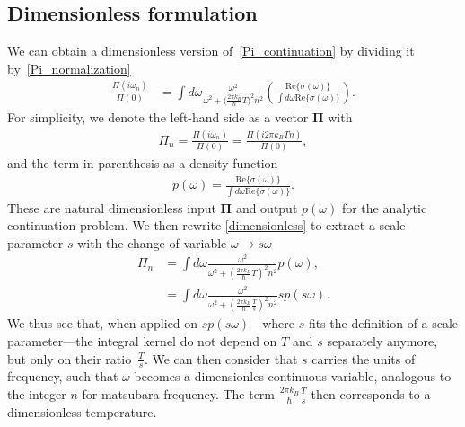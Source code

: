 \documentclass[notitlepage,11pt,nofootinbib]{revtex4-1}
\renewcommand{\vec}[1]{\bm{#1}}
\begin{document}
\subsection{Dimensionless formulation}
We can obtain a dimensionless version of~\eqref{Pi_continuation} by dividing it by~\eqref{Pi_normalization}
\begin{align}
\frac{\Pi(i\omega_n)}{\Pi(0)}
&=
\int d\omega \frac{\omega^2}{
\omega^2+
\big(\frac{2\pi k_B}{\hbar}T\big)
^2n^2
}\left(
\frac{\text{Re}\{ \sigma(\omega) \}}
{\int d\omega \text{Re}\{ \sigma(\omega) \}}
\right).
\label{dimensionless}
\end{align}
For simplicity, we denote the left-hand side as a vector $\vec \Pi$ with
\begin{align}
\Pi_n = \frac{\Pi(i\omega_n)}{\Pi(0)} = \frac{\Pi(i2\pi k_B T n)}{\Pi(0)},
\end{align}
and the term in parenthesis as a density function
\begin{align}
p(\omega) =
\frac{\text{Re}\{ \sigma(\omega) \}}
{\int d\omega \text{Re}\{ \sigma(\omega) \}}.
\label{eq_def_density}
\end{align}
These are natural dimensionless input $\vec\Pi$ and output $p(\omega)$ for the analytic continuation problem. We then rewrite \eqref{dimensionless} to extract a scale parameter $s$ with the change of variable $\omega\rightarrow s\omega$
\begin{align}
\Pi_n
&=
\int d\omega \frac{\omega^2}{\omega^2 + \left(\frac{2\pi k_B}{\hbar}T\right)^2n^2}
p(\omega),
\label{dimensionless_with_p1}
\\
&=
\int d\omega \frac{\omega^2}{\omega^2 + \left(\frac{2\pi k_B}{\hbar}\frac{T}{s}\right)^2n^2}
sp(s\omega).
\label{dimensionless_with_p2}
\end{align}
We thus see that, when applied on $sp(s\omega)$---where $s$ fits the definition of a scale parameter---the integral kernel do not depend on $T$ and $s$ separately anymore, but only on their ratio~$\frac{T}{s}$. 
We can then consider that $s$ carries the units of frequency, such that $\omega$ becomes a dimensionles continuous variable, analogous to the integer $n$ for matsubara frequency. The term $\frac{2\pi k_B}{\hbar}\frac{T}{s}$ then corresponds to a dimensionless temperature.
\end{document}
